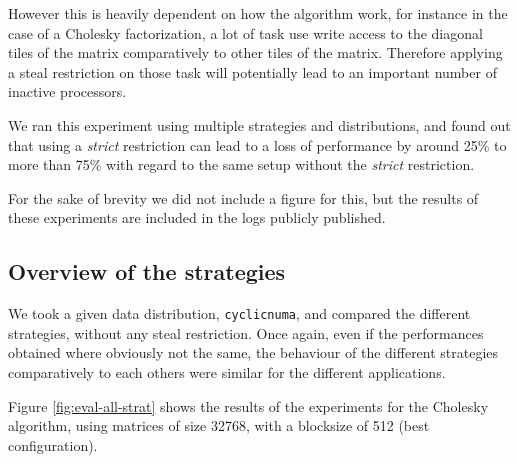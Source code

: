 \documentclass{Styles/llncs}
\begin{document}
However this is heavily dependent on how the algorithm work, for instance in the case
of a Cholesky factorization, a lot of task use write access to the diagonal tiles
of the matrix comparatively to other tiles of the matrix. Therefore applying
a steal restriction on those task will potentially lead to an important number
of inactive processors.

We ran this experiment using multiple strategies and distributions, and found
out that using a \emph{strict} restriction can lead to a loss of performance by
around 25\% to more than 75\% with regard to the same setup without the \emph{strict}
restriction.

For the sake of brevity we did not include a figure for this, but the results of these
experiments are included in the logs publicly published.




\subsection{Overview of the strategies}

We took a given data distribution, \verb/cyclicnuma/, and compared the
different strategies, without any steal restriction.
Once again, even if the performances obtained where obviously not the same, the behaviour
of the different strategies comparatively to each others were similar for the
different applications.

Figure \ref{fig:eval-all-strat} shows the results of the experiments for the
Cholesky algorithm, using matrices of size 32768, with a blocksize of 512 (best configuration).
\end{document}
